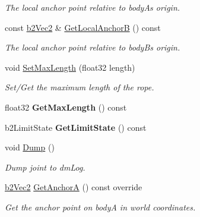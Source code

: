 \begin{DoxyCompactItemize}
\begin{DoxyCompactList}\small\item\em The local anchor point relative to bodyA\textquotesingle{}s origin. \end{DoxyCompactList}\item 
\mbox{\label{classb2RopeJoint_a8a9b925c7ffa11d331ba369cc9fe2ac5}} 
const \hyperlink{structb2Vec2}{b2\+Vec2} \& \hyperlink{classb2RopeJoint_a8a9b925c7ffa11d331ba369cc9fe2ac5}{Get\+Local\+AnchorB} () const
\begin{DoxyCompactList}\small\item\em The local anchor point relative to bodyB\textquotesingle{}s origin. \end{DoxyCompactList}\item 
\mbox{\label{classb2RopeJoint_a92cea201d21acd2f2a7cc9b00e165848}} 
void \hyperlink{classb2RopeJoint_a92cea201d21acd2f2a7cc9b00e165848}{Set\+Max\+Length} (float32 length)
\begin{DoxyCompactList}\small\item\em Set/\+Get the maximum length of the rope. \end{DoxyCompactList}\item 
\mbox{\label{classb2RopeJoint_abdcc1962f25103a49f6e3f4182559efa}} 
float32 {\bfseries Get\+Max\+Length} () const
\item 
\mbox{\label{classb2RopeJoint_ab7b606273b65339f0ab502675f32997e}} 
b2\+Limit\+State {\bfseries Get\+Limit\+State} () const
\item 
\mbox{\label{classb2RopeJoint_a4612dca9851a66701893a48d896dbd14}} 
void \hyperlink{classb2RopeJoint_a4612dca9851a66701893a48d896dbd14}{Dump} ()
\begin{DoxyCompactList}\small\item\em Dump joint to dm\+Log. \end{DoxyCompactList}\item 
\mbox{\label{classb2RopeJoint_a5757fdeb008bf1bbe15348e80aab9402}} 
\hyperlink{structb2Vec2}{b2\+Vec2} \hyperlink{classb2RopeJoint_a5757fdeb008bf1bbe15348e80aab9402}{Get\+AnchorA} () const override
\begin{DoxyCompactList}\small\item\em Get the anchor point on bodyA in world coordinates. \end{DoxyCompactList}\item 

\end{DoxyCompactItemize}
